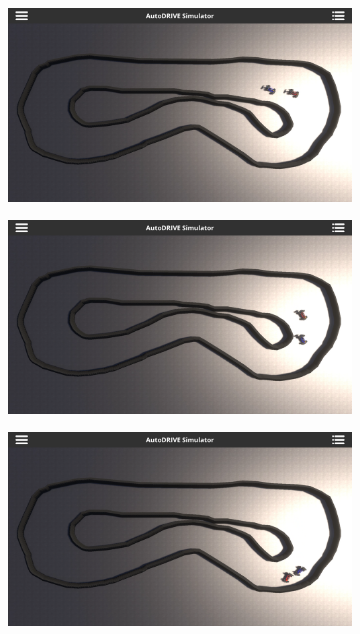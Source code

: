 \documentclass[letterpaper, 10 pt, conference]{ieeeconf}  %
\begin{document}
\begin{figure}[t]
\begin{subfigure}[b]{0.16\linewidth}
         \caption{}
         \label{fig10c}
     \end{subfigure}
     \hfill
     \begin{subfigure}[b]{0.16\linewidth}
         \centering
         \includegraphics[width=\linewidth]{Fig10d.png}
         \caption{}
         \label{fig10d}
     \end{subfigure}
     \hfill
     \begin{subfigure}[b]{0.16\linewidth}
         \centering
         \includegraphics[width=\linewidth]{Fig10e.png}
         \caption{}
         \label{fig10e}
     \end{subfigure}
     \hfill
     \begin{subfigure}[b]{0.16\linewidth}
         \centering
         \includegraphics[width=\linewidth]{Fig10f.png}

\end{subfigure}
\end{figure}
\end{document}
